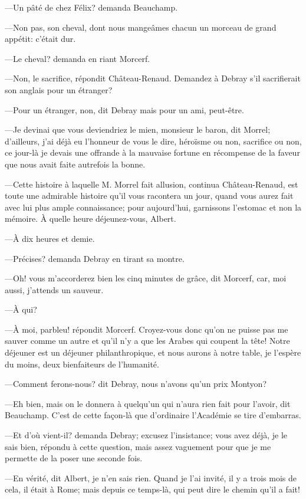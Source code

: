 —Un pâté de chez Félix? demanda Beauchamp. 

—Non pas, son cheval, dont nous mangeâmes chacun un morceau de grand appétit: c'était dur. 

—Le cheval? demanda en riant Morcerf. 

—Non, le sacrifice, répondit Château-Renaud. Demandez à Debray s'il sacrifierait son anglais pour un étranger? 

—Pour un étranger, non, dit Debray mais pour un ami, peut-être. 

—Je devinai que vous deviendriez le mien, monsieur le baron, dit Morrel; d'ailleurs, j'ai déjà eu l'honneur de vous le dire, héroïsme ou non, sacrifice ou non, ce jour-là je devais une offrande à la mauvaise fortune en récompense de la faveur que nous avait faite autrefois la bonne. 

—Cette histoire à laquelle M. Morrel fait allusion, continua Château-Renaud, est toute une admirable histoire qu'il vous racontera un jour, quand vous aurez fait avec lui plus ample connaissance; pour aujourd'hui, garnissons l'estomac et non la mémoire. À quelle heure déjeunez-vous, Albert. 

—À dix heures et demie. 

—Précises? demanda Debray en tirant sa montre. 

—Oh! vous m'accorderez bien les cinq minutes de grâce, dit Morcerf, car, moi aussi, j'attends un sauveur. 

—À qui? 

—À moi, parbleu! répondit Morcerf. Croyez-vous donc qu'on ne puisse pas me sauver comme un autre et qu'il n'y a que les Arabes qui coupent la tête! Notre déjeuner est un déjeuner philanthropique, et nous aurons à notre table, je l'espère du moins, deux bienfaiteurs de l'humanité. 

—Comment ferons-nous? dit Debray, nous n'avons qu'un prix Montyon? 

—Eh bien, mais on le donnera à quelqu'un qui n'aura rien fait pour l'avoir, dit Beauchamp. C'est de cette façon-là que d'ordinaire l'Académie se tire d'embarras. 

—Et d'où vient-il? demanda Debray; excusez l'insistance; vous avez déjà, je le sais bien, répondu à cette question, mais assez vaguement pour que je me permette de la poser une seconde fois.  

—En vérité, dit Albert, je n'en sais rien. Quand je l'ai invité, il y a trois mois de cela, il était à Rome; mais depuis ce temps-là, qui peut dire le chemin qu'il a fait! 

